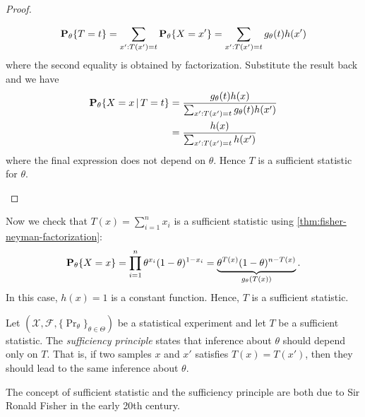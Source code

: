 \documentclass[a4paper]{article}
\begin{document}
\begin{proof}
\begin{itemize}
\begin{align*}
				\pr[\theta]{T=t}
				= \sum_{x':T(x')=t} \pr[\theta]{X=x'}
				= \sum_{x':T(x')=t} g_{\theta}(t) h(x')
			\end{align*}
			where the second equality is obtained by factorization.
			Substitute the result back and we have
			\begin{align*}
				\pr[\theta]{X=x\given T=t}
				&= \frac{ g_{\theta}(t) h(x) }{\sum_{x':T(x')=t} g_{\theta}(t) h(x')} \\
				&= \frac{  h(x) }{\sum_{x':T(x')=t} h(x')}
			\end{align*}
			where the final expression does not depend on $\theta$.
			Hence $T$ is a sufficient statistic for $\theta$.
			\qedhere
	\end{itemize}
\end{proof}

\begin{example}
	Now we check that $T(x)=\sum_{i=1}^{n}x_i$ is a sufficient statistic using
	\autoref{thm:fisher-neyman-factorization}:
	\begin{align*}
		\pr[\theta]{X=x}
		= \prod_{i=1}^{n} \theta^{x_i} (1-\theta)^{1-x_i}
		= \underbrace{\theta^{T(x)} (1-\theta)^{n-T(x)}}_{g_{\theta}(T(x))}.
	\end{align*}
	In this case, $h(x)=1$ is a constant function.
	Hence, $T$ is a sufficient statistic.
\end{example}

\begin{definition}
	Let $(\mathcal{X},\mathcal{F},\{\Pr_{\theta}\}_{\theta\in\Theta})$ be a statistical experiment and
	let $T$ be a sufficient statistic.
	The \emph{sufficiency principle} states that inference about $\theta$ should depend only on $T$.
	That is, if two samples $x$ and $x'$ satisfies $T(x)=T(x')$,
	then they should lead to the same inference about $\theta$.
\end{definition}

\begin{remark}
	The concept of sufficient statistic and the sufficiency principle
	are both due to Sir Ronald Fisher in the early 20th century.
\end{remark}

\printbibliography
\end{document}
